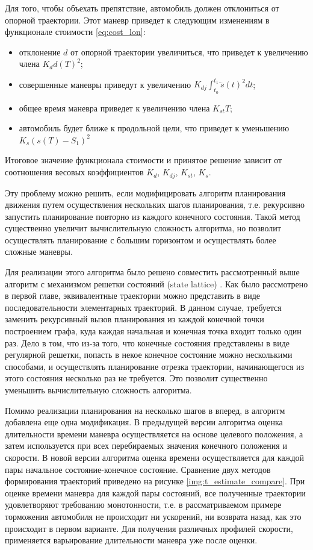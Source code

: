 Для того, чтобы объехать препятствие, автомобиль должен отклониться от опорной траектории. Этот маневр приведет
к следующим изменениям в функционале стоимости \ref{eq:cost_lon}:
\begin{itemize}
      \item отклонение $d$ от опорной траектории увеличиться, что приведет к увеличению члена $K_dd(T)^2$;
      \item совершенные маневры приведут к увеличению $K_{dj}\int_{t_0}^{t_1}{\dddot{s}(t)^2dt}$;
      \item общее время маневра приведет к увеличению члена $K_{st}T$;
      \item автомобиль будет ближе к продольной цели, что приведет к уменьшению $K_s(s(T)-S_1)^2$
\end{itemize}

Итоговое значение функционала стоимости и принятое решение зависит от соотношения весовых коэффициентов $K_d$, $K_{dj}$,
$K_{st}$, $K_s$.

Эту проблему можно решить, если модифицировать алгоритм планирования движения путем осуществления нескольких шагов
планирования, т.е. рекурсивно запустить планирование повторно из каждого конечного состояния. Такой метод существенно
увеличит вычислительную сложность алгоритма, но позволит осуществлять планирование с большим горизонтом и осуществлять
более сложные маневры.

Для реализации этого алгоритма было решено совместить рассмотренный выше алгоритм с механизмом решетки состояний
(state lattice) \cite{motion_planning_lattice_1}. Как было рассмотрено в первой главе, эквивалентные траектории
можно представить в виде последовательности элементарных траекторий. В данном случае, требуется заменить рекурсивный
вызов планирования из каждой конечной точки построением графа, куда каждая начальная и конечная точка входит только один
раз. Дело в том, что из-за того, что конечные состояния представлены в виде регулярной решетки, попасть в некое
конечное состояние можно несколькими способами, и осуществлять планирование отрезка траектории, начинающегося из
этого состояния несколько раз не требуется. Это позволит существенно уменьшить вычислительную сложность алгоритма.

Помимо реализации планирования на несколько шагов в вперед, в алгоритм добавлена еще одна модификация. В предыдущей
версии алгоритма оценка длительности времени маневра осуществляется на основе целевого положения, а затем используется
при всех перебираемых значения конечного положения и скорости. В новой версии алгоритма оценка времени осуществляется
для каждой пары начальное состояние-конечное состояние. Сравнение двух методов формирования траекторий приведено
на рисунке \ref{img:t_estimate_compare}. При оценке времени маневра для каждой пары состояний, все полученные
траектории удовлетворяют требованию монотонности, т.е. в рассматриваемом примере торможения автомобиля не происходит
ни ускорений, ни возврата назад, как это происходит в первом варианте. Для получения различных профилей скорости,
применяется варьирование длительности маневра уже после оценки.

